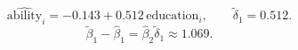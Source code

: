 \[
\widehat{\mathrm{ability}}_i = -0.143 + 0.512\,\mathrm{education}_i,
\qquad \tilde{\delta}_1=0.512.
\]
\[
\tilde{\beta}_1-\hat{\beta}_1=\hat{\beta}_2\tilde{\delta}_1\approx 1.069.
\]
